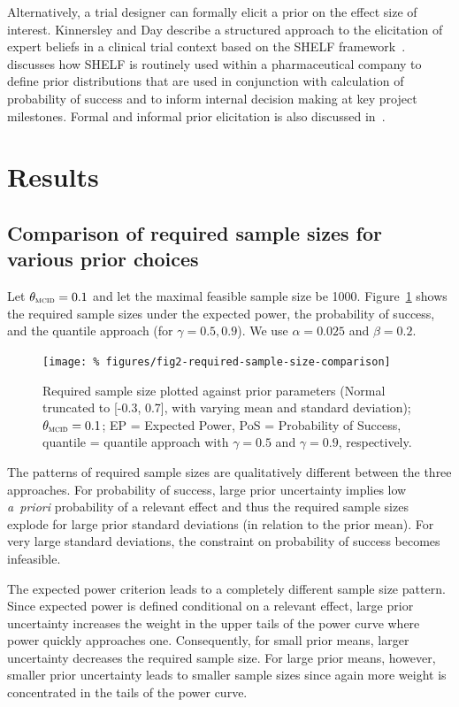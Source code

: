\documentclass{article}
\begin{document}
Alternatively, a trial designer can formally elicit a prior on the effect size of interest.
Kinnersley and Day describe a structured approach to the elicitation of expert beliefs in a clinical trial context based on the SHELF framework~\citep{kinnersley_13,shelf}.
\citet{dallow_18} discusses how SHELF is routinely used within a pharmaceutical company to define prior distributions that are used in conjunction with calculation of probability of success and to inform internal decision making at key project milestones.
Formal and informal prior elicitation is also discussed in~\citet{spiegelhalter-2004}.



\section{Results}

\subsection{Comparison of required sample sizes for various prior choices}

Let $\mcid=0.1$ and let the maximal feasible sample size be 1000.
Figure~\ref{fig:n-vs-prior-parameters} shows the required sample sizes under the expected power, the probability of success, and the quantile approach (for $\gamma = 0.5, 0.9$).
We use $\alpha = 0.025$ and $\beta = 0.2$.
\begin{figure}[htbp]
    \centering
    \texttt{[image: \%
        figures/fig2-required-sample-size-comparison]}
    \caption{Required sample size plotted against prior parameters (Normal truncated to [-0.3, 0.7], with varying mean and standard deviation); $\mcid=0.1$; EP = Expected Power, PoS = Probability of Success, quantile = quantile approach with $\gamma=0.5$ and $\gamma=0.9$, respectively.}
    \label{fig:n-vs-prior-parameters}
\end{figure}

The patterns of required sample sizes are qualitatively different between the three approaches.
For probability of success, large prior uncertainty implies low \textit{a~priori} probability of a relevant effect and thus the required sample sizes explode for large prior standard deviations (in relation to the prior mean).
For very large standard deviations, the constraint on probability of success becomes infeasible.

The expected power criterion leads to a completely different sample size pattern.
Since expected power is defined conditional on a relevant effect, large prior uncertainty increases the weight in the upper tails of the power curve where power quickly approaches one.
Consequently, for small prior means, larger uncertainty decreases the required sample size.
For large prior means, however, smaller prior uncertainty leads to smaller sample sizes since again more weight is concentrated in the tails of the power curve.
\end{document}
